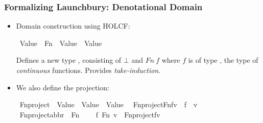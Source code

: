 \documentclass{beamer}
\begin{document}
\begin{frame}
\frametitle{Formalizing Launchbury: Denotational Domain}

\begin{itemize}
\item Domain construction using HOLCF:
\begin{isabelle}
\isamarkupfalse%
\ Value\ {\isacharequal}\ Fn\ {\isacharparenleft}\ {\isachardoublequoteopen}Value\ {\isasymrightarrow}\ Value{\isachardoublequoteclose}{\isacharparenright}
\end{isabelle}
Defines a new type , consisting of $\bot$ and $Fn\ f$ where $f$ is of type , the type of \emph{continuous} functions. Provides \emph{take-induction}.
\item We also define the projection:
\begin{isabelle}
\isamarkupfalse%
\ Fn{\isacharunderscore}project\ {\isacharcolon}{\isacharcolon}\ {\isachardoublequoteopen}Value\ {\isasymrightarrow}\ Value\ {\isasymrightarrow}\ Value{\isachardoublequoteclose}\isanewline
\ \ {\isachardoublequoteopen}Fn{\isacharunderscore}project{\isasymcdot}{\isacharparenleft}Fn{\isasymcdot}f{\isacharparenright}{\isasymcdot}v\ {\isacharequal}\ f\ {\isasymcdot}\ v{\isachardoublequoteclose}\isanewline
\isanewline
{}\isamarkupfalse%
\ Fn{\isacharunderscore}project{\isacharunderscore}abbr\ {\isacharparenleft}\ {\isachardoublequoteopen}{\isasymdown}Fn{\isachardoublequoteclose}\ {}{}{\isacharparenright}\isanewline
\ \ \ {\isachardoublequoteopen}f\ {\isasymdown}Fn\ v\ {\isasymequiv}\ Fn{\isacharunderscore}project{\isasymcdot}f{\isasymcdot}v{\isachardoublequoteclose}\isanewline
\end{isabelle}
\end{itemize}
\end{frame}
\end{document}
